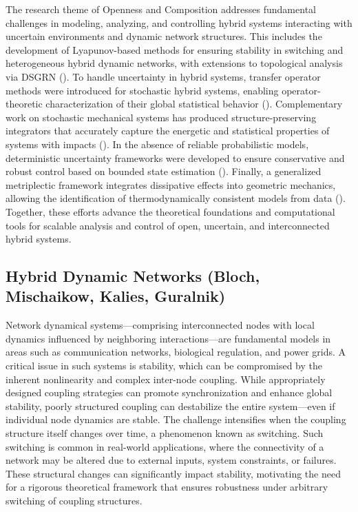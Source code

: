 \documentclass[letterpaper,11pt]{article}
\begin{document}
The research theme of Openness and Composition addresses fundamental challenges in modeling, analyzing, and controlling hybrid systems interacting with uncertain environments and dynamic network structures. 
This includes the development of Lyapunov-based methods for ensuring stability in switching and heterogeneous hybrid dynamic networks, with extensions to topological analysis via DSGRN (). 
To handle uncertainty in hybrid systems, transfer operator methods were introduced for stochastic hybrid systems, enabling operator-theoretic characterization of their global statistical behavior (). 
Complementary work on stochastic mechanical systems has produced structure-preserving integrators that accurately capture the energetic and statistical properties of systems with impacts (). 
In the absence of reliable probabilistic models, deterministic uncertainty frameworks were developed to ensure conservative and robust control based on bounded state estimation (). 
Finally, a generalized metriplectic framework integrates dissipative effects into geometric mechanics, allowing the identification of thermodynamically consistent models from data (). 
Together, these efforts advance the theoretical foundations and computational tools for scalable analysis and control of open, uncertain, and interconnected hybrid systems.

\subsection{Hybrid Dynamic Networks (Bloch, Mischaikow, Kalies, Guralnik)}\label{sec:dynamic networks in DSGRN}

Network dynamical systems—comprising interconnected nodes with local dynamics influenced by neighboring interactions—are fundamental models in areas such as communication networks, biological regulation, and power grids. 
A critical issue in such systems is stability, which can be compromised by the inherent nonlinearity and complex inter-node coupling. 
While appropriately designed coupling strategies can promote synchronization and enhance global stability, poorly structured coupling can destabilize the entire system—even if individual node dynamics are stable.
The challenge intensifies when the coupling structure itself changes over time, a phenomenon known as switching. 
Such switching is common in real-world applications, where the connectivity of a network may be altered due to external inputs, system constraints, or failures. 
These structural changes can significantly impact stability, motivating the need for a rigorous theoretical framework that ensures robustness under arbitrary switching of coupling structures.
\end{document}
